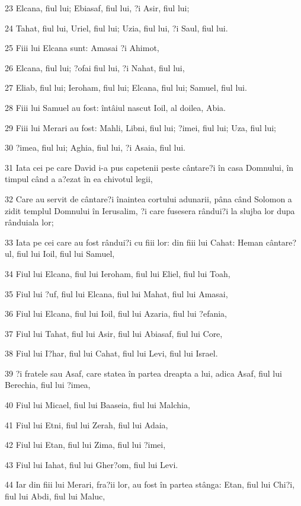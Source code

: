 \par 23 Elcana, fiul lui; Ebiasaf, fiul lui, ?i Asir, fiul lui;
\par 24 Tahat, fiul lui, Uriel, fiul lui; Uzia, fiul lui, ?i Saul, fiul lui.
\par 25 Fiii lui Elcana sunt: Amasai ?i Ahimot,
\par 26 Elcana, fiul lui; ?ofai fiul lui, ?i Nahat, fiul lui,
\par 27 Eliab, fiul lui; Ieroham, fiul lui; Elcana, fiul lui; Samuel, fiul lui.
\par 28 Fiii lui Samuel au fost: întâiul nascut Ioil, al doilea, Abia.
\par 29 Fiii lui Merari au fost: Mahli, Libni, fiul lui; ?imei, fiul lui; Uza, fiul lui;
\par 30 ?imea, fiul lui; Aghia, fiul lui, ?i Asaia, fiul lui.
\par 31 Iata cei pe care David i-a pus capetenii peste cântare?i în casa Domnului, în timpul când a a?ezat în ea chivotul legii,
\par 32 Care au servit de cântare?i înaintea cortului adunarii, pâna când Solomon a zidit templul Domnului în Ierusalim, ?i care fusesera rândui?i la slujba lor dupa rânduiala lor;
\par 33 Iata pe cei care au fost rândui?i cu fiii lor: din fiii lui Cahat: Heman cântare?ul, fiul lui Ioil, fiul lui Samuel,
\par 34 Fiul lui Elcana, fiul lui Ieroham, fiul lui Eliel, fiul lui Toah,
\par 35 Fiul lui ?uf, fiul lui Elcana, fiul lui Mahat, fiul lui Amasai,
\par 36 Fiul lui Elcana, fiul lui Ioil, fiul lui Azaria, fiul lui ?efania,
\par 37 Fiul lui Tahat, fiul lui Asir, fiul lui Abiasaf, fiul lui Core,
\par 38 Fiul lui I?har, fiul lui Cahat, fiul lui Levi, fiul lui Israel.
\par 39 ?i fratele sau Asaf, care statea în partea dreapta a lui, adica Asaf, fiul lui Berechia, fiul lui ?imea,
\par 40 Fiul lui Micael, fiul lui Baaseia, fiul lui Malchia,
\par 41 Fiul lui Etni, fiul lui Zerah, fiul lui Adaia,
\par 42 Fiul lui Etan, fiul lui Zima, fiul lui ?imei,
\par 43 Fiul lui Iahat, fiul lui Gher?om, fiul lui Levi.
\par 44 Iar din fiii lui Merari, fra?ii lor, au fost în partea stânga: Etan, fiul lui Chi?i, fiul lui Abdi, fiul lui Maluc,
